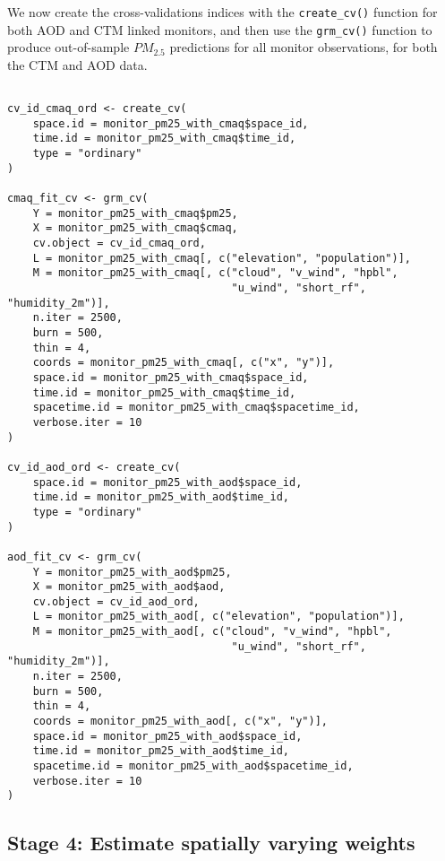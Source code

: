 \documentclass[12pt]{article}
\begin{document}
We now create the cross-validations indices with the \texttt{create\_cv()} function for both AOD and CTM linked monitors, and then use the \texttt{grm\_cv()} function to produce out-of-sample $PM_{2.5}$ predictions for all monitor observations, for both the CTM and AOD data.

\begin{lstlisting}

cv_id_cmaq_ord <- create_cv(
    space.id = monitor_pm25_with_cmaq$space_id,
    time.id = monitor_pm25_with_cmaq$time_id, 
    type = "ordinary"
)

cmaq_fit_cv <- grm_cv(
    Y = monitor_pm25_with_cmaq$pm25,
    X = monitor_pm25_with_cmaq$cmaq,
    cv.object = cv_id_cmaq_ord,
    L = monitor_pm25_with_cmaq[, c("elevation", "population")],
    M = monitor_pm25_with_cmaq[, c("cloud", "v_wind", "hpbl", 
                                   "u_wind", "short_rf", "humidity_2m")],
    n.iter = 2500,
    burn = 500,
    thin = 4,
    coords = monitor_pm25_with_cmaq[, c("x", "y")],
    space.id = monitor_pm25_with_cmaq$space_id,
    time.id = monitor_pm25_with_cmaq$time_id,
    spacetime.id = monitor_pm25_with_cmaq$spacetime_id,
    verbose.iter = 10
)

cv_id_aod_ord <- create_cv(
    space.id = monitor_pm25_with_aod$space_id,
    time.id = monitor_pm25_with_aod$time_id,
    type = "ordinary"
)

aod_fit_cv <- grm_cv(
    Y = monitor_pm25_with_aod$pm25,
    X = monitor_pm25_with_aod$aod,
    cv.object = cv_id_aod_ord,
    L = monitor_pm25_with_aod[, c("elevation", "population")],
    M = monitor_pm25_with_aod[, c("cloud", "v_wind", "hpbl", 
                                   "u_wind", "short_rf", "humidity_2m")],
    n.iter = 2500,
    burn = 500,
    thin = 4,
    coords = monitor_pm25_with_aod[, c("x", "y")],
    space.id = monitor_pm25_with_aod$space_id,
    time.id = monitor_pm25_with_aod$time_id,
    spacetime.id = monitor_pm25_with_aod$spacetime_id,
    verbose.iter = 10
)

\end{lstlisting}



\subsection*{Stage 4: Estimate spatially varying weights}
\end{document}
